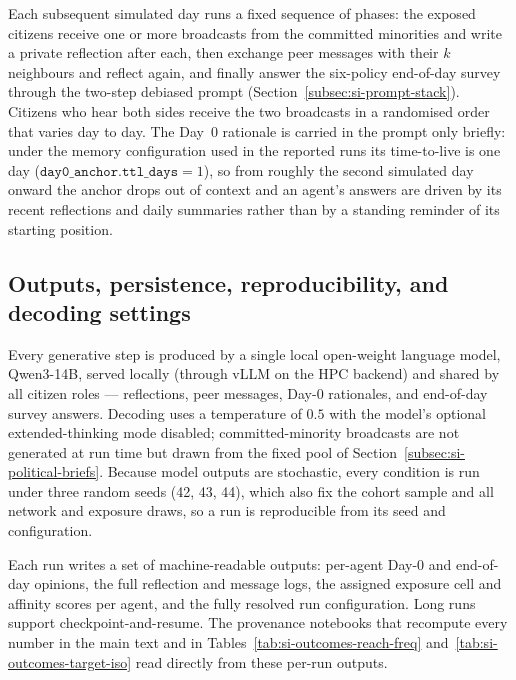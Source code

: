 \documentclass[pdflatex,sn-mathphys-num]{sn-jnl}%
\theoremstyle{thmstyleone}%
\theoremstyle{thmstyletwo}%
\theoremstyle{thmstylethree}%
\begin{document}
Each subsequent simulated day runs a fixed sequence of phases: the exposed citizens
receive one or more broadcasts from the committed minorities and write a private
reflection after each, then exchange peer messages with their $k$ neighbours and
reflect again, and finally answer the six-policy end-of-day survey through the
two-step debiased prompt (Section~\ref{subsec:si-prompt-stack}). Citizens who hear
both sides receive the two broadcasts in a randomised order that varies day to day.
The Day~0 rationale is carried in the prompt only briefly: under the memory
configuration used in the reported runs its time-to-live is one day
($\texttt{day0\_anchor.ttl\_days}=1$), so from roughly the second simulated day
onward the anchor drops out of context and an agent's answers are driven by its
recent reflections and daily summaries rather than by a standing reminder of its
starting position.

\subsection{Outputs, persistence, reproducibility, and decoding settings}\label{subsec:si-outputs}

Every generative step is produced by a single local open-weight language model,
Qwen3-14B, served locally (through vLLM on the HPC backend) and shared by all
citizen roles --- reflections, peer messages, Day-0 rationales, and end-of-day
survey answers. Decoding uses a temperature of $0.5$ with the model's optional
extended-thinking mode disabled; committed-minority broadcasts are not generated at
run time but drawn from the fixed pool of
Section~\ref{subsec:si-political-briefs}. Because model outputs are stochastic,
every condition is run under three random seeds (42, 43, 44), which also fix the
cohort sample and all network and exposure draws, so a run is reproducible from its
seed and configuration.

Each run writes a set of machine-readable outputs: per-agent Day-0 and end-of-day
opinions, the full reflection and message logs, the assigned exposure cell and
affinity scores per agent, and the fully resolved run configuration. Long runs
support checkpoint-and-resume. The provenance notebooks that recompute every number
in the main text and in Tables~\ref{tab:si-outcomes-reach-freq}
and~\ref{tab:si-outcomes-target-iso} read directly from these per-run outputs.
\end{document}
